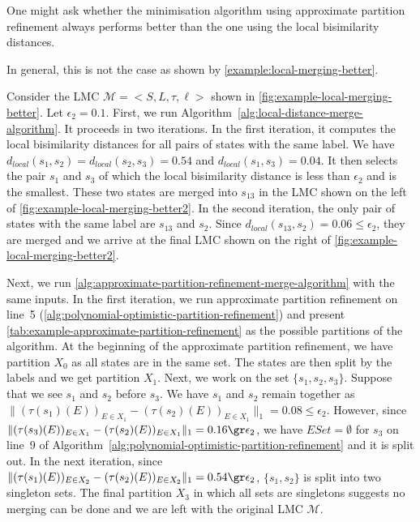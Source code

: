 \documentclass[a4paper,UKenglish,cleveref,autoref,thm-restate]{lipics-v2021}
\newcommand{\local}{\mathit{local}}
\newcommand{\M}{\mathcal{M}}
\newcommand{\modify}[1]{{\color{black}#1}}
\begin{document}
One might ask whether the minimisation algorithm using approximate partition refinement always performs better than the one using the local bisimilarity distances. \modify{In general, this is not the case as shown by \cref{example:local-merging-better}. %

\begin{example}\label{example:local-merging-better}	
	Consider the LMC $\M = <S, L, \tau, \ell>$ shown in \cref{fig:example-local-merging-better}. Let $\epsilon_2 = 0.1$. First, we run Algorithm~\ref{alg:local-distance-merge-algorithm}. It proceeds in two iterations. In the first iteration, it computes the local bisimilarity distances for all pairs of states with the same label. We have $d_{\local}(s_1, s_2) = d_{\local}(s_2, s_3)= 0.54$ and $d_{\local}(s_1, s_3) = 0.04$. It then selects the pair $s_1$ and $s_3$ of which the local bisimilarity distance is less than $\epsilon_2$ and is the smallest. These two states are merged into $s_{13}$ in the LMC shown on the left of \cref{fig:example-local-merging-better2}. In the second iteration, the only pair of states with the same label are $s_{13}$ and $s_2$. Since $d_{\local}(s_{13}, s_2) = 0.06 \le \epsilon_2$, they are merged and we arrive at the final LMC shown on the right of \cref{fig:example-local-merging-better2}.
	
	Next, we run \cref{alg:approximate-partition-refinement-merge-algorithm} with the same inputs. In the first iteration, we run approximate partition refinement on line~5 (\cref{alg:polynomial-optimistic-partition-refinement}) and present \cref{tab:example-approximate-partition-refinement} as the possible partitions of the algorithm. At the beginning of the approximate partition refinement, we have partition $X_0$ as all states are in the same set. The states are then split by the labels and we get partition $X_1$. Next, we work on the set $\{s_1, s_2, s_3\}$. Suppose that we see $s_1$ and $s_2$ before $s_3$. We have $s_1$ and $s_2$ remain together as $\|(\tau(s_1)(E))_{E \in X_1}  - (\tau(s_2)(E))_{E \in X_1}\|_1 = 0.08 \le \epsilon_2$. However, since $\|(\tau(s_3)(E))_{E \in X_1}  - (\tau(s_2)(E))_{E \in X_1}\|_1 = 0.16 \gr \epsilon_2$, we have $ESet = \emptyset$ for $s_3$ on line~9 of Algorithm~\ref{alg:polynomial-optimistic-partition-refinement} and it is split out. In the next iteration, since $\|(\tau(s_1)(E))_{E \in X_2}  - (\tau(s_2)(E))_{E \in X_2}\|_1 = 0.54 \gr \epsilon_2$, $\{s_1, s_2\}$ is split into two singleton sets. The final partition $X_3$ in which all sets are singletons suggests no merging can be done and we are left with the original LMC $\M$.
	

\end{example}}
\end{document}
